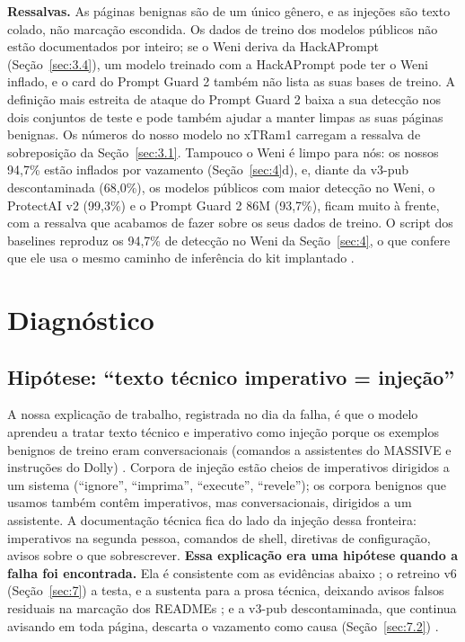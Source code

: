 \documentclass[11pt]{article}
\begin{document}
\textbf{Ressalvas.} As páginas benignas são de um único gênero, e as injeções são texto colado, não marcação escondida. Os dados de treino dos modelos públicos não estão documentados por inteiro; se o Weni deriva da HackAPrompt (Seção~\ref{sec:3.4}), um modelo treinado com a HackAPrompt pode ter o Weni inflado, e o card do Prompt Guard 2 também não lista as suas bases de treino. A definição mais estreita de ataque do Prompt Guard 2 baixa a sua detecção nos dois conjuntos de teste e pode também ajudar a manter limpas as suas páginas benignas. Os números do nosso modelo no xTRam1 carregam a ressalva de sobreposição da Seção~\ref{sec:3.1}. Tampouco o Weni é limpo para nós: os nossos 94,7\% estão inflados por vazamento (Seção~\ref{sec:4}d), e, diante da v3-pub descontaminada (68,0\%), os modelos públicos com maior detecção no Weni, o ProtectAI v2 (99,3\%) e o Prompt Guard 2 86M (93,7\%), ficam muito à frente, com a ressalva que acabamos de fazer sobre os seus dados de treino. O script dos baselines reproduz os 94,7\% de detecção no Weni da Seção~\ref{sec:4}, o que confere que ele usa o mesmo caminho de inferência do kit implantado%
.

\section{Diagnóstico}\label{sec:6}

\subsection{Hipótese: ``texto técnico imperativo = injeção''}\label{sec:6.1}

A nossa explicação de trabalho, registrada no dia da falha, é que o modelo aprendeu a tratar texto técnico e imperativo como injeção porque os exemplos benignos de treino eram conversacionais (comandos a assistentes do MASSIVE e instruções do Dolly)%
. Corpora de injeção estão cheios de imperativos dirigidos a um sistema (``ignore'', ``imprima'', ``execute'', ``revele''); os corpora benignos que usamos também contêm imperativos, mas conversacionais, dirigidos a um assistente. A documentação técnica fica do lado da injeção dessa fronteira: imperativos na segunda pessoa, comandos de shell, diretivas de configuração, avisos sobre o que sobrescrever. \textbf{Essa explicação era uma hipótese quando a falha foi encontrada.} Ela é consistente com as evidências abaixo%
; o retreino v6 (Seção~\ref{sec:7}) a testa, e a sustenta para a prosa técnica, deixando avisos falsos residuais na marcação dos READMEs%
; e a v3-pub descontaminada, que continua avisando em toda página, descarta o vazamento como causa (Seção~\ref{sec:7.2})%
.
\end{document}
